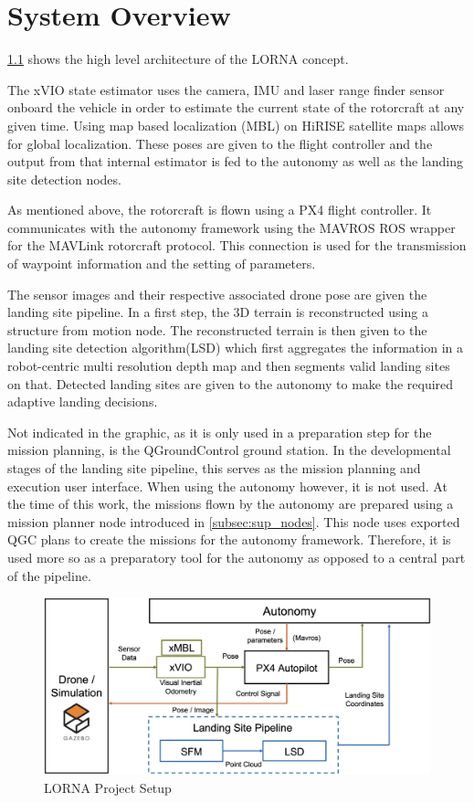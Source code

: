 \chapter{System Overview}

\cref{fig:lorna_setup} shows the high level architecture of the LORNA concept. 

The xVIO state estimator uses the camera, IMU and laser range finder sensor onboard the vehicle in order to estimate the current state of the rotorcraft at any given time. Using map based localization (MBL) on HiRISE satellite maps allows for global localization. These poses are given to the flight controller and the output from that internal estimator is fed to the autonomy as well as the landing site detection nodes.

As mentioned above, the rotorcraft is flown using a PX4 flight controller. It communicates with the autonomy framework using the MAVROS ROS wrapper for the MAVLink rotorcraft protocol. This connection is used for the transmission of waypoint information and the setting of parameters.

The sensor images and their respective associated drone pose are given the landing site pipeline. In a first step, the 3D terrain is reconstructed using a structure from motion node. The reconstructed terrain is then given to the landing site detection algorithm(LSD) which first aggregates the information in a robot-centric multi resolution depth map and then segments valid landing sites on that. Detected landing sites are given to the autonomy to make the required adaptive landing decisions.

Not indicated in the graphic, as it is only used in a preparation step for the mission planning, is the QGroundControl ground station. In the developmental stages of the landing site pipeline, this serves as the mission planning and execution user interface. When using the autonomy however, it is not used. At the time of this work, the missions flown by the autonomy are prepared using a mission planner node introduced in \cref{subsec:sup_nodes}. This node uses exported QGC plans to create the missions for the autonomy framework. Therefore, it is used more so as a preparatory tool for the autonomy as opposed to a central part of the pipeline.

\begin{figure}[ht]
    \centering
    \includegraphics[scale=0.18]{images/system_overview/setup_flowchart_with_vio.png}
    \caption{LORNA Project Setup}
    \label{fig:lorna_setup}
\end{figure}

